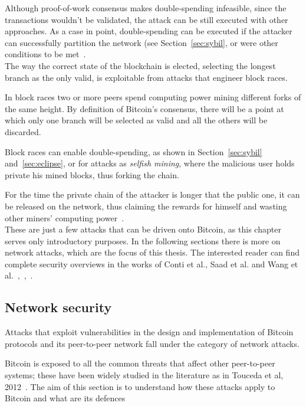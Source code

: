 \documentclass[12pt, letterpaper, twoside]{article}
\begin{document}
Although proof-of-work consensus makes double-spending infeasible, since the transactions wouldn't be validated, the attack can be still executed with other approaches. As a case in point, double-spending can be executed  if the attacker can successfully partition the network (see Section~\ref{sec:sybil}, or were other conditions to be met~\cite{doublespendfastpay}.\\

The way the correct state of the blockchain is elected, selecting the longest branch as the only valid, is exploitable from attacks that engineer block races.

In block races two or more peers spend computing power mining different forks of the same height. By definition of Bitcoin's consensus, there will be a point at which only one branch will be selected as valid and all the others will be discarded.

Block races can enable double-spending, as shown in Section~\ref{sec:sybil} and~\ref{sec:eclipse}, or for attacks as \textit{selfish mining}, where the malicious user holds private his mined blocks, thus forking the chain.

For the time the private chain of the attacker is longer that the public one, it can be released on the network, thus claiming the rewards for himself and wasting other miners' computing power~\cite{selfishmining}.\\

These are just a few attacks that can be driven onto Bitcoin, as this chapter serves only introductory purposes. In the following sections there is more on network attacks, which are the focus of this thesis. The interested reader can find complete security overviews in the works of Conti et al., Saad et al. and Wang et al.~\cite{contiatksurvey},~\cite{saad2019attacksurface},~\cite{secpermissionlessblock}.

\subsection{Network security}\label{sec:netsec}
Attacks that exploit vulnerabilities in the design and implementation of Bitcoin protocols and its peer-to-peer network fall under the category of network attacks.

Bitcoin is exposed to all the common threats that affect other peer-to-peer systems; these have been widely studied in the literature as in Touceda et al, 2012~\cite{toucedafakeboot}. The aim of this section is to understand how these attacks apply to Bitcoin and what are its defences\\
\end{document}
